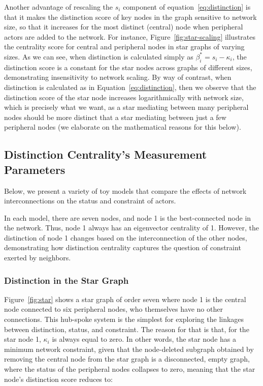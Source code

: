 \documentclass[12pt]{article}
\begin{document}
Another advantage of rescaling the $s_i$ component of equation~\ref{eq:distinction} is that it makes the distinction score of key nodes in the graph sensitive to network size, so that it increases for the most distinct (central) node when peripheral actors are added to the network. For instance, Figure~\ref{fig:star-scaling} illustrates the centrality score for central and peripheral nodes in star graphs of varying sizes. As we can see, when distinction is calculated simply as $\beta^*_i = s_i - \kappa_i$, the distinction score is a constant for the star nodes across graphs of different sizes, demonstrating insensitivity to network scaling. By way of contrast, when distinction is calculated as in Equation~\ref{eq:distinction}, then we observe that the distinction score of the star node increases logarithmically with network size, which is precisely what we want, as a star mediating between many peripheral nodes should be more distinct that a star mediating between just a few peripheral nodes (we elaborate on the mathematical reasons for this below).  

\subsection{Distinction Centrality's Measurement Parameters}
Below, we present a variety of toy models that compare the effects of network interconnections on the status and constraint of actors.

In each model, there are seven nodes, and node 1 is the best-connected node in the network. Thus, node 1 always has an eigenvector centrality of 1. However, the distinction of node 1 changes based on the interconnection of the other nodes, demonstrating how distinction centrality captures the question of constraint exerted by neighbors. 

\subsubsection{Distinction in the Star Graph}
Figure~\ref{fig:star} shows a star graph of order seven where node 1 is the central node connected to six peripheral nodes, who themselves have no other connections. This hub-spoke system is the simplest for exploring the linkages between distinction, status, and constraint. The reason for that is that, for the star node 1, $\kappa_i$ is always equal to zero. In other words, the star node has a minimum network constraint, given that the node-deleted subgraph obtained by removing the central node from the star graph is a disconnected, empty graph, where the status of the peripheral nodes collapses to zero, meaning that the star node's distinction score reduces to:
\end{document}

